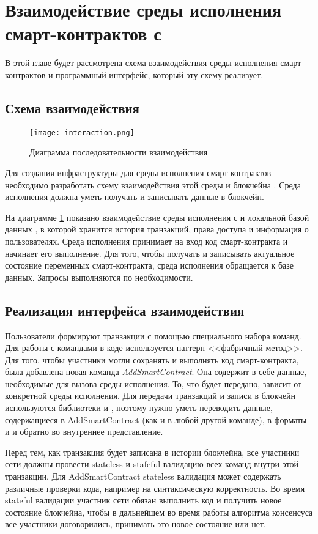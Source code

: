 \section{Взаимодействие среды исполнения смарт-кон\-трак\-тов с }
В этой главе будет рассмотрена схема взаимодействия среды исполнения смарт-контрактов и программный интерфейс, который эту схему реализует.
\subsection{Схема взаимодействия}
\label{Interaction}
\begin{figure}[h]
    \texttt{[image: interaction.png]}
	\caption{Диаграмма последовательности взаимодействия}
	\label {interaction}
\end{figure}
Для создания инфраструктуры для среды исполнения смарт-кон\-трак\-тов необходимо разработать схему взаимодействия этой среды и блокчейна .
Среда исполнения должна уметь получать и записывать данные в блокчейн.

На диаграмме \ref{interaction} показано взаимодействие среды исполнения с  и локальной базой данных , в которой хранится история транзакций, права доступа и информация о пользователях.
Среда исполнения принимает на вход код смарт-контракта и начинает его выполнение.
Для того, чтобы получать и записывать актуальное состояние переменных смарт-контракта, среда исполнения обращается к базе данных.
Запросы выполняются по необходимости.

\subsection{Реализация интерфейса взаимодействия}
Пользователи формируют транзакции с помощью специального набора команд.
Для работы с командами в коде используется паттерн <<фабричный метод>>.
Для того, чтобы участники могли сохранять и выполнять код смарт-контракта, была добавлена новая команда \emph{Add\-Smart\-Con\-tract}.
Она содержит в себе данные, необходимые для вызова среды исполнения.
То, что будет передано, зависит от конкретной среды исполнения.
Для передачи транзакций и записи в блокчейн используются библиотеки  и , поэтому нужно уметь переводить данные, содержащиеся в AddSmartContract (как и в любой другой команде), в форматы  и  и обратно во внутреннее представление.

Перед тем, как транзакция будет записана в истории блокчейна, все участники сети должны провести stateless и stafeful валидацию всех команд внутри этой транзакции.
Для AddSmartContract stateless валидация может содержать различные проверки кода, например на синтаксическую корректность.
Во время stateful валидации участник сети обязан выполнить код и получить новое состояние блокчейна, чтобы в дальнейшем во время работы алгоритма консенсуса все участники договорились, принимать это новое состояние или нет.